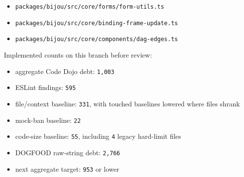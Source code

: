\begin{itemize}
\item
  \texttt{p\allowbreak{}a\allowbreak{}c\allowbreak{}k\allowbreak{}a\allowbreak{}g\allowbreak{}e\allowbreak{}s\allowbreak{}/\allowbreak{}b\allowbreak{}i\allowbreak{}j\allowbreak{}o\allowbreak{}u\allowbreak{}/\allowbreak{}s\allowbreak{}r\allowbreak{}c\allowbreak{}/\allowbreak{}c\allowbreak{}o\allowbreak{}r\allowbreak{}e\allowbreak{}/\allowbreak{}f\allowbreak{}o\allowbreak{}r\allowbreak{}m\allowbreak{}s\allowbreak{}/\allowbreak{}f\allowbreak{}o\allowbreak{}r\allowbreak{}m\allowbreak{}-\allowbreak{}u\allowbreak{}t\allowbreak{}i\allowbreak{}l\allowbreak{}s\allowbreak{}.\allowbreak{}t\allowbreak{}s}
\item
  \texttt{p\allowbreak{}a\allowbreak{}c\allowbreak{}k\allowbreak{}a\allowbreak{}g\allowbreak{}e\allowbreak{}s\allowbreak{}/\allowbreak{}b\allowbreak{}i\allowbreak{}j\allowbreak{}o\allowbreak{}u\allowbreak{}/\allowbreak{}s\allowbreak{}r\allowbreak{}c\allowbreak{}/\allowbreak{}c\allowbreak{}o\allowbreak{}r\allowbreak{}e\allowbreak{}/\allowbreak{}b\allowbreak{}i\allowbreak{}n\allowbreak{}d\allowbreak{}i\allowbreak{}n\allowbreak{}g\allowbreak{}-\allowbreak{}f\allowbreak{}r\allowbreak{}a\allowbreak{}m\allowbreak{}e\allowbreak{}-\allowbreak{}u\allowbreak{}p\allowbreak{}d\allowbreak{}a\allowbreak{}t\allowbreak{}e\allowbreak{}.\allowbreak{}t\allowbreak{}s}
\item
  \texttt{p\allowbreak{}a\allowbreak{}c\allowbreak{}k\allowbreak{}a\allowbreak{}g\allowbreak{}e\allowbreak{}s\allowbreak{}/\allowbreak{}b\allowbreak{}i\allowbreak{}j\allowbreak{}o\allowbreak{}u\allowbreak{}/\allowbreak{}s\allowbreak{}r\allowbreak{}c\allowbreak{}/\allowbreak{}c\allowbreak{}o\allowbreak{}r\allowbreak{}e\allowbreak{}/\allowbreak{}c\allowbreak{}o\allowbreak{}m\allowbreak{}p\allowbreak{}o\allowbreak{}n\allowbreak{}e\allowbreak{}n\allowbreak{}t\allowbreak{}s\allowbreak{}/\allowbreak{}d\allowbreak{}a\allowbreak{}g\allowbreak{}-\allowbreak{}e\allowbreak{}d\allowbreak{}g\allowbreak{}e\allowbreak{}s\allowbreak{}.\allowbreak{}t\allowbreak{}s}
\end{itemize}

Implemented counts on this branch before review:

\begin{itemize}
\tightlist
\item
  aggregate Code Dojo debt: \texttt{1\allowbreak{},\allowbreak{}0\allowbreak{}0\allowbreak{}3}
\item
  ESLint findings: \texttt{5\allowbreak{}9\allowbreak{}5}
\item
  file/context baseline: \texttt{3\allowbreak{}3\allowbreak{}1}, with touched baselines lowered where files shrank
\item
  mock-ban baseline: \texttt{2\allowbreak{}2}
\item
  code-size baseline: \texttt{5\allowbreak{}5}, including \texttt{4} legacy hard-limit files
\item
  DOGFOOD raw-string debt: \texttt{2\allowbreak{},\allowbreak{}7\allowbreak{}6\allowbreak{}6}
\item
  next aggregate target: \texttt{9\allowbreak{}5\allowbreak{}3} or lower
\end{itemize}

